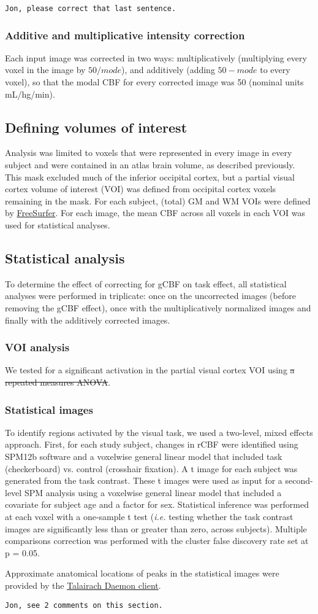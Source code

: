 \verb|Jon, please correct that last sentence.|
\subsubsection{Additive and multiplicative intensity correction}
Each input image was corrected in two ways: multiplicatively (multiplying every voxel in the image by $50/mode$), and additively (adding $50-mode$ to every voxel), so that the modal CBF for every corrected image was 50 (nominal units mL/hg/min).

\subsection{Defining volumes of interest}
Analysis was limited to voxels that were represented in every image in every subject and were contained in an atlas brain volume, as described previously.\cite{Black_2010} This mask excluded much of the inferior occipital cortex, but a partial visual cortex volume of interest (VOI) was defined from occipital cortex voxels remaining in the mask. For each subject, (total) GM and WM VOIs were defined by \href{https://surfer.nmr.mgh.harvard.edu/}{FreeSurfer}.\cite{Desikan2006968} For each image, the mean CBF across all voxels in each VOI was used for statistical analyses.

\subsection{Statistical analysis}
To determine the effect of correcting for gCBF on task effect, all statistical analyses were performed in triplicate: once on the uncorrected images (before removing the gCBF effect), once with the multiplicatively normalized images and finally with the additively corrected images.

\subsubsection{VOI analysis}
We tested for a significant activation in the partial visual cortex VOI using \sout{a repeated measures ANOVA}.

\subsubsection{Statistical images}
To identify regions activated by the visual task, we used a two-level, mixed effects approach.  First, for each study subject, changes in rCBF were identified using SPM12b software and a voxelwise general linear model that included task (checkerboard) vs. control (crosshair fixation). A t image for each subject was generated from the task contrast. These t images were used as input for a second-level SPM analysis using a voxelwise general linear model that included a covariate for subject age and a factor for sex. Statistical inference was performed at each voxel with a one-sample t test (\textit{i.e.} testing whether the task contrast images are significantly less than or greater than zero, across subjects). Multiple comparisons correction was performed with the cluster false discovery rate set at p = 0.05. 

Approximate anatomical locations of peaks in the statistical images were provided by the \href{http://www.talairach.org}{Talairach Daemon client}.\cite{20408222,10912591}

\verb|Jon, see 2 comments on this section.|